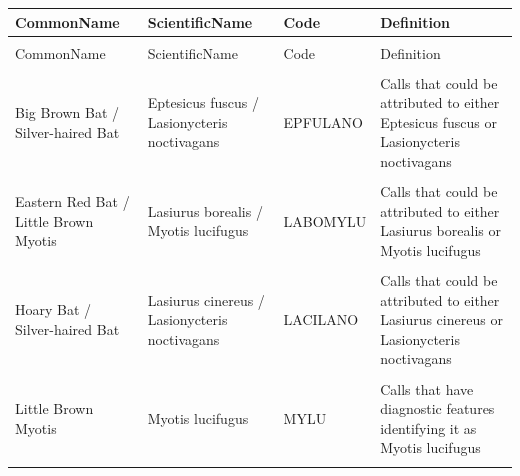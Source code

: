 \documentclass[
  letterpaper,
  DIV=11,
  numbers=noendperiod]{scrartcl}
\begin{document}
\begin{longtable*}{>{\raggedright\arraybackslash}p{3.5cm}>{\raggedright\arraybackslash}p{3.5cm}>{\raggedright\arraybackslash}p{2cm}>{\raggedright\arraybackslash}p{6cm}}
\toprule
CommonName & ScientificName & Code & Definition\\
\midrule
\endfirsthead
{}\\
\toprule
CommonName & ScientificName & Code & Definition\\
\midrule
\endhead

\endfoot
\bottomrule
\endlastfoot
{} &  &  & \\
Big Brown Bat / Silver-haired Bat & Eptesicus fuscus / Lasionycteris noctivagans & EPFULANO & Calls that could be attributed to either Eptesicus fuscus or Lasionycteris noctivagans\\
 &  &  & \\
Eastern Red Bat / Little Brown Myotis & Lasiurus borealis / Myotis lucifugus & LABOMYLU & Calls that could be attributed to either Lasiurus borealis or Myotis lucifugus\\
 &  &  & \\
\addlinespace
Hoary Bat / Silver-haired Bat & Lasiurus cinereus / Lasionycteris noctivagans & LACILANO & Calls that could be attributed to either Lasiurus cinereus or Lasionycteris noctivagans\\
 &  &  & \\
Little Brown Myotis & Myotis lucifugus & MYLU & Calls that have diagnostic features identifying it as Myotis lucifugus\\
 &  &  & \\

\end{longtable*}
\end{document}
